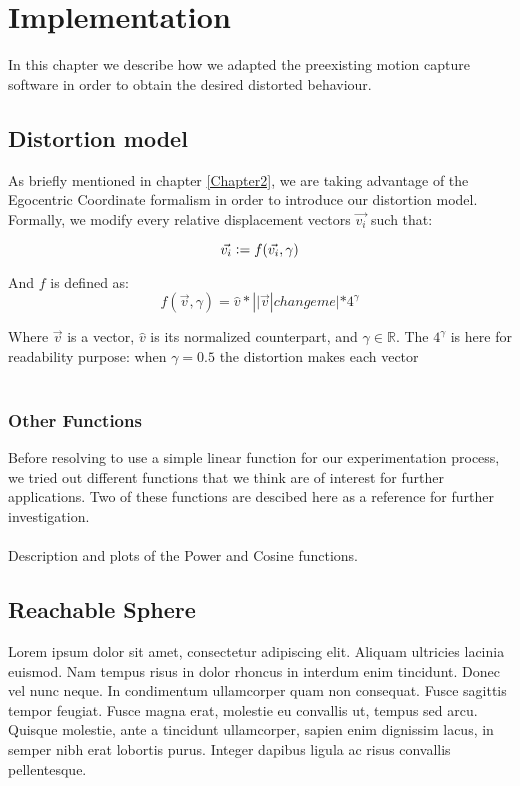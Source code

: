 
\chapter{Implementation} %

\label{Chapter3} %

In this chapter we describe how we adapted the preexisting motion capture software in order to obtain the desired distorted behaviour.

\section{Distortion model}

As briefly mentioned in chapter \ref{Chapter2}, we are taking advantage of the Egocentric Coordinate formalism in order to introduce our distortion model. Formally, we modify every relative displacement vectors $\vec{v_i}$ such that:

\begin{equation}
\vec{v_i} \vcentcolon= f(\vec{v_i},\gamma )
\end{equation}

\noindent
And $f$ is defined as:
\begin{equation}
f(\vec{v},\gamma ) = \hat{v} * \left||\vec{v}\right|changeme| * 4^\gamma
\end{equation}

\noindent
Where $\vec{v}$ is a vector, $\hat{v}$ is its normalized counterpart, and $\gamma \in \mathbb{R}$. The $4^\gamma$ is here for readability purpose: when $\gamma = 0.5$ the distortion makes each vector
\\\\


\subsection*{Other Functions}

Before resolving to use a simple linear function for our experimentation process, we tried out different functions that we think are of interest for further applications. Two of these functions are descibed here as a reference for further investigation.
\\\\
Description and plots of the Power and Cosine functions.

\section{Reachable Sphere}

Lorem ipsum dolor sit amet, consectetur adipiscing elit. Aliquam ultricies lacinia euismod. Nam tempus risus in dolor rhoncus in interdum enim tincidunt. Donec vel nunc neque. In condimentum ullamcorper quam non consequat. Fusce sagittis tempor feugiat. Fusce magna erat, molestie eu convallis ut, tempus sed arcu. Quisque molestie, ante a tincidunt ullamcorper, sapien enim dignissim lacus, in semper nibh erat lobortis purus. Integer dapibus ligula ac risus convallis pellentesque.
